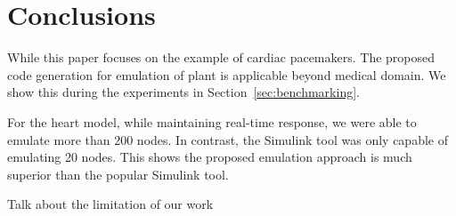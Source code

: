 \section{Conclusions}

While this paper focuses on the example of cardiac pacemakers.
The proposed code generation for emulation of plant is applicable 
beyond medical domain.
We show this during the experiments in Section~\ref{sec:benchmarking}.


For the heart model, while maintaining real-time response,
 we were able to emulate more than 200 nodes. In contrast,
 the Simulink tool was only capable of emulating 20 nodes. 
 This shows the proposed emulation approach is much superior than 
 the popular Simulink tool.


Talk about the limitation of our work
